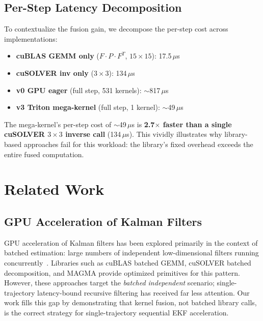 \documentclass[pdflatex,sn-mathphys-num]{sn-jnl}%
\theoremstyle{thmstyleone}%
\theoremstyle{thmstyletwo}%
\theoremstyle{thmstylethree}%
\begin{document}
\subsection{Per-Step Latency Decomposition}

To contextualize the fusion gain, we decompose the per-step cost across implementations:

\begin{itemize}
\item \textbf{cuBLAS GEMM only} ($F \cdot P \cdot F^T$, $15\times15$): 17.5\,$\mu$s
\item \textbf{cuSOLVER inv only} ($3\times3$): 134\,$\mu$s
\item \textbf{v0 GPU eager} (full step, 531 kernels): $\sim$817\,$\mu$s
\item \textbf{v3 Triton mega-kernel} (full step, 1 kernel): $\sim$49\,$\mu$s
\end{itemize}

The mega-kernel's per-step cost of $\sim$49\,$\mu$s is \textbf{2.7$\times$ faster than a single cuSOLVER $3\times3$ inverse call} (134\,$\mu$s). This vividly illustrates why library-based approaches fail for this workload: the library's fixed overhead exceeds the entire fused computation.

\section{Related Work}\label{sec5}

\subsection{GPU Acceleration of Kalman Filters}

GPU acceleration of Kalman filters has been explored primarily in the context of batched estimation: large numbers of independent low-dimensional filters running concurrently~\cite{bib4}. Libraries such as cuBLAS batched GEMM, cuSOLVER batched decomposition, and MAGMA provide optimized primitives for this pattern. However, these approaches target the \textit{batched independent} scenario; single-trajectory latency-bound recursive filtering has received far less attention. Our work fills this gap by demonstrating that kernel fusion, not batched library calls, is the correct strategy for single-trajectory sequential EKF acceleration.
\end{document}
